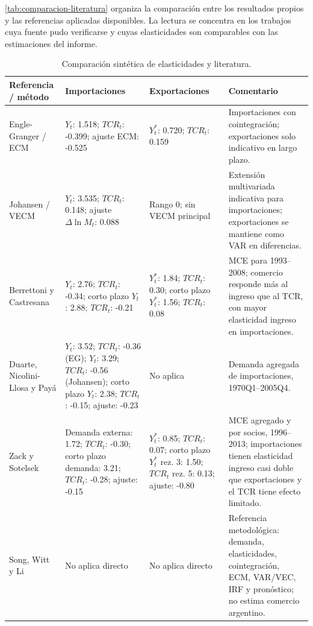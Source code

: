 \documentclass[11pt,a4paper]{article}
\begin{document}
\autoref{tab:comparacion-literatura} organiza la comparación entre los
resultados propios y las referencias aplicadas disponibles. La lectura se
concentra en los trabajos cuya fuente pudo verificarse y cuyas elasticidades
son comparables con las estimaciones del informe.

\begin{table}[H]
\centering
\caption{Comparación sintética de elasticidades y literatura.}
\label{tab:comparacion-literatura}
\scriptsize
\setlength{\tabcolsep}{4pt}
\begin{tabular}{p{2.8cm}p{3.1cm}p{3.1cm}p{4.3cm}}
\toprule
Referencia / método & Importaciones & Exportaciones & Comentario \\
\midrule
Engle-Granger / ECM & \(Y_t\): 1.518; \(TCR_t\): -0.399; ajuste ECM: -0.525 & \(Y_t^*\): 0.720; \(TCR_t\): 0.159 & Importaciones con cointegración; exportaciones solo indicativo en largo plazo. \\
Johansen / VECM & \(Y_t\): 3.535; \(TCR_t\): 0.148; ajuste \(\Delta \ln M_t\): 0.088 & Rango 0; sin VECM principal & Extensión multivariada indicativa para importaciones; exportaciones se mantiene como VAR en diferencias. \\
Berrettoni y Castresana \cite{berrettoni_castresana_2008} & \(Y_t\): 2.76; \(TCR_t\): -0.34; corto plazo \(Y_t\): 2.88; \(TCR_t\): -0.21 & \(Y_t^*\): 1.84; \(TCR_t\): 0.30; corto plazo \(Y_t^*\): 1.56; \(TCR_t\): 0.08 & MCE para 1993--2008; comercio responde más al ingreso que al TCR, con mayor elasticidad ingreso en importaciones. \\
Duarte, Nicolini-Llosa y Payá \cite{duarte_nicolini_llosa_paya_2007} & \(Y_t\): 3.52; \(TCR_t\): -0.36 (EG); \(Y_t\): 3.29; \(TCR_t\): -0.56 (Johansen); corto plazo \(Y_t\): 2.38; \(TCR_t\): -0.15; ajuste: -0.23 & No aplica & Demanda agregada de importaciones, 1970Q1--2005Q4. \\
Zack y Sotelsek \cite{zack_sotelsek_2016} & Demanda externa: 1.72; \(TCR_t\): -0.30; corto plazo demanda: 3.21; \(TCR_t\): -0.28; ajuste: -0.15 & \(Y_t^*\): 0.85; \(TCR_t\): 0.07; corto plazo \(Y_t^*\) rez. 3: 1.50; \(TCR_t\) rez. 5: 0.13; ajuste: -0.80 & MCE agregado y por socios, 1996--2013; importaciones tienen elasticidad ingreso casi doble que exportaciones y el TCR tiene efecto limitado. \\
Song, Witt y Li \cite{song_witt_li_2008} & No aplica directo & No aplica directo & Referencia metodológica: demanda, elasticidades, cointegración, ECM, VAR/VEC, IRF y pronóstico; no estima comercio argentino. \\
\bottomrule
\end{tabular}
\end{table}
	
\end{document}
